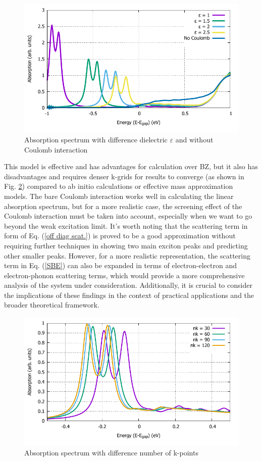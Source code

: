 \documentclass[12pt,english,a4paper]{article}
\begin{document}
\begin{figure}
	\begin{center}
		\includegraphics[width=0.75\linewidth]{images/varyepsilon.pdf}
		\caption[Absorption spectrum with difference dielectric $\varepsilon$ and without Coulomb interaction]{Absorption spectrum with difference dielectric $\varepsilon$ and without Coulomb interaction}
		\label{Vary e}
	\end{center}
\end{figure}\null
\quad This model is effective and has advantages for calculation over BZ, but it also has disadvantages and requires denser k-grids for results to converge (as shown in Fig. \ref{Vary nk}) compared to ab initio calculations or effective mass approximation models. The bare Coulomb interaction works well in calculating the linear absorption spectrum, but for a more realistic case, the screening effect of the Coulomb interaction must be taken into account\cite{erben_excitation-induced_2018,erben_optical_2022}, especially when we want to go beyond the weak excitation limit. It's worth noting that the scattering term in form of Eq. (\ref{off diag scat.}) is proved to be a good approximation without requiring further techniques in showing two main exciton peaks and predicting other smaller peaks. However, for a more realistic representation, the scattering term in Eq. (\ref{SBE}) can also be expanded in terms of electron-electron and electron-phonon scattering terms, which would provide a more comprehensive analysis of the system under consideration. Additionally, it is crucial to consider the implications of these findings in the context of practical applications and the broader theoretical framework.
\begin{figure}
	\begin{center}
		\includegraphics[width=0.75\linewidth]{images/varynk.pdf}
		\caption[Absorption spectrum with difference number of k-points]{Absorption spectrum with difference number of k-points}
		\label{Vary nk}
	\end{center}
\end{figure}\null
\newpage
\end{document}
